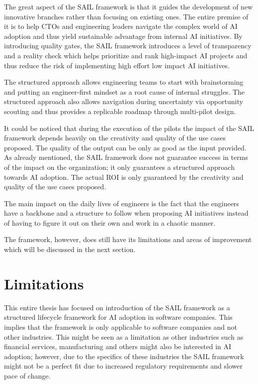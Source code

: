 \documentclass[]{imc-inf}
\begin{document}
The great aspect of the SAIL framework is that it guides the development of new innovative branches rather than focusing on existing ones. The entire premise of it is to help CTOs and engineering leaders navigate the complex world of AI adoption and thus yield sustainable advantage from internal AI initiatives. By introducing quality gates, the SAIL framework introduces a level of transparency and a reality check which helps prioritize and rank high-impact AI projects and thus reduce the risk of implementing high effort low impact AI initiatives.

The structured approach allows engineering teams to start with brainstorming and putting an engineer-first mindset as a root cause of internal struggles. The structured approach also allows navigation during uncertainty via opportunity scouting and thus provides a replicable roadmap through multi-pilot design. 

It could be noticed that during the execution of the pilots the impact of the SAIL framework depends heavily on the creativity and quality of the use cases proposed. The quality of the output can be only as good as the input provided. As already mentioned, the SAIL framework does not guarantee success in terms of the impact on the organization; it only guarantees a structured approach towards AI adoption. The actual ROI is only guaranteed by the creativity and quality of the use cases proposed. 

The main impact on the daily lives of engineers is the fact that the engineers have a backbone and a structure to follow when proposing AI initiatives instead of having to figure it out on their own and work in a chaotic manner. 

The framework, however, does still have its limitations and areas of improvement which will be discussed in the next section.


\section{Limitations}\label{limitations}

This entire thesis has focused on introduction of the SAIL framework as a structured lifecycle framework for AI adoption in software companies. This implies that the framework is only applicable to software companies and not other industries. 
This might be seen as a limitation as other industries such as financial services, manufacturing and others might also be interested in AI adoption; however, due to the specifics of these industries the SAIL framework might not be a perfect fit due to increased regulatory requirements and slower pace of change. 
\end{document}
